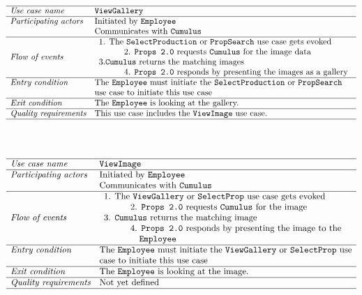 \documentclass[12pt]{article}
\begin{document}
\[
\begin{array}{ll}
\hline
\textit{Use case name} & \texttt{ViewGallery} \\
\hline
\textit{Participating actors} & \text{Initiated by \texttt{Employee}}\\ &
\text{Communicates with \texttt{Cumulus}}\\
\hline
\textit{Flow of events} & 
\begin{array}{l}
\text{1. The \texttt{SelectProduction} or \texttt{PropSearch} use case gets evoked}\\
\quad \quad \quad \text{2. \texttt{Props 2.0} requests \texttt{Cumulus} for the image data}\\
3.\text{\texttt{Cumulus} returns the matching images}\\
\quad \quad \quad \text{4. \texttt{Props 2.0} responds by presenting the images as a gallery}
\end{array} \\
\hline
\textit{Entry condition} &
\text{The \texttt{Employee} must initiate the \texttt{SelectProduction} or \texttt{PropSearch}}\\ &
\text{use case to initiate this use case}\\
\hline
\textit{Exit condition} & \text{The \texttt{Employee} is looking at the gallery.} \\
\hline
\textit{Quality requirements} & \text{This use case includes the \texttt{ViewImage} use case.} \\
\hline
\end{array}
\]
\\
\\
\[
\begin{array}{ll}
\hline
\textit{Use case name} & \texttt{ViewImage} \\
\hline
\textit{Participating actors} & \text{Initiated by \texttt{Employee}}\\ &
\text{Communicates with \texttt{Cumulus}}\\
\hline
\textit{Flow of events} & 
\begin{array}{l}
\text{1. The \texttt{ViewGallery} or \texttt{SelectProp} use case gets evoked}\\
\quad \quad \quad \text{2. \texttt{Props 2.0} requests \texttt{Cumulus} for the image}\\
\text{3. \texttt{Cumulus} returns the matching image}\\
\quad \quad \quad \text{4. \texttt{Props 2.0} responds by presenting the image to the}\\ \quad \quad \quad \quad\texttt{Employee}
\end{array} \\
\hline
\textit{Entry condition} &
\text{The \texttt{Employee} must initiate the \texttt{ViewGallery} or \texttt{SelectProp} use}\\ &
\text{case to initiate this use case}\\
\hline
\textit{Exit condition} & \text{The \texttt{Employee} is looking at the image.} \\
\hline
\textit{Quality requirements} & \text{Not yet defined} \\
\hline
\end{array}
\]
\end{document}
